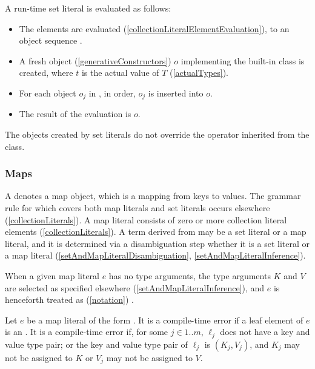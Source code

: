 \documentclass[makeidx]{article}
\begin{document}
{\LMHash{}%
A run-time set literal 
is evaluated as follows:

\begin{itemize}
\item
  The elements  are evaluated
  (\ref{collectionLiteralElementEvaluation}),
  to an object sequence .
\item
  A fresh object (\ref{generativeConstructors}) $o$
  implementing the built-in class  is created,
  where $t$ is the actual value of $T$
  (\ref{actualTypes}).
\item
  For each object $o_j$ in , in order,
  $o_j$ is inserted into $o$.
\item
  The result of the evaluation is $o$.
\end{itemize}

\LMHash{}%
The objects created by set literals do not override
the \lit{==} operator inherited from the  class.


\subsubsection{Maps}

\LMHash{}%
A  denotes a map object,
which is a mapping from keys to values.
The grammar rule for  which covers both
map literals and set literals occurs elsewhere
(\ref{collectionLiterals}).
A map literal consists of zero or more collection literal elements
(\ref{collectionLiterals}).
A term derived from 
may be a set literal or a map literal,
and it is determined via a disambiguation step
whether it is a set literal or a map literal
(\ref{setAndMapLiteralDisambiguation}, \ref{setAndMapLiteralInference}).

\LMHash{}%
When a given map literal $e$ has no type arguments,
the type arguments $K$ and $V$ are selected as specified elsewhere
(\ref{setAndMapLiteralInference}),
and $e$ is henceforth treated as
(\ref{notation})
.


\LMHash{}%
Let $e$ be a map literal of the form
.
It is a compile-time error if a leaf element of $e$ is an
.
It is a compile-time error if, for some $j \in 1 .. m$,
$\ell_j$ does not have a key and value type pair;
or the key and value type pair of $\ell_j$ is $(K_j, V_j)$,
and $K_j$ may not be assigned to $K$ or
$V_j$ may not be assigned to $V$.

}
\end{document}
